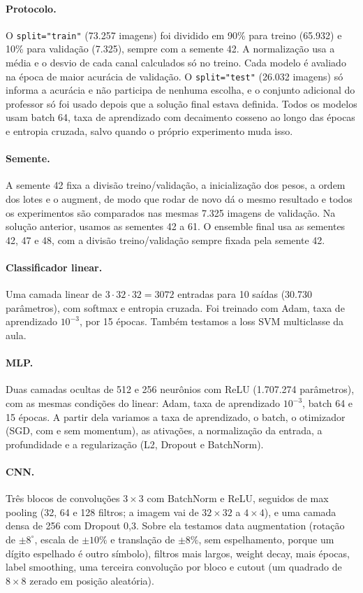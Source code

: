 \documentclass[11pt,a4paper]{article}
\begin{document}
\paragraph{Protocolo.} O \texttt{split="train"} (73.257 imagens) foi dividido em 90\% para treino (65.932) e
10\% para validação (7.325), sempre com a semente 42. A normalização usa a média e o desvio de cada canal
calculados só no treino. Cada modelo é avaliado na época de maior acurácia de validação. O \texttt{split="test"}
(26.032 imagens) só informa a acurácia e não participa de nenhuma escolha, e o conjunto adicional do professor
só foi usado depois que a solução final estava definida. Todos os modelos usam batch 64, taxa de aprendizado
com decaimento cosseno ao longo das épocas e entropia cruzada, salvo quando o próprio experimento muda isso.

\paragraph{Semente.} A semente 42 fixa a divisão treino/validação, a inicialização dos pesos, a ordem dos lotes
e o augment, de modo que rodar de novo dá o mesmo resultado e todos os experimentos são comparados nas mesmas
7.325 imagens de validação. Na solução anterior, usamos as sementes 42 a 61. O ensemble final usa as sementes 42, 47 e 48,
com a divisão treino/validação sempre fixada pela semente 42.

\paragraph{Classificador linear.} Uma camada linear de $3\cdot32\cdot32 = 3072$ entradas para 10 saídas
(30.730 parâmetros), com softmax e entropia cruzada. Foi treinado com Adam, taxa de aprendizado $10^{-3}$, por 15
épocas. Também testamos a loss SVM multiclasse da aula.

\paragraph{MLP.} Duas camadas ocultas de 512 e 256 neurônios com ReLU (1.707.274 parâmetros), com as mesmas
condições do linear: Adam, taxa de aprendizado $10^{-3}$, batch 64 e 15 épocas. A partir dela variamos a taxa de
aprendizado, o batch, o otimizador (SGD, com e sem momentum), as ativações, a normalização da entrada, a
profundidade e a regularização (L2, Dropout e BatchNorm).

\paragraph{CNN.} Três blocos de convoluções $3\times3$ com BatchNorm e ReLU, seguidos de max pooling (32, 64 e
128 filtros; a imagem vai de $32\times32$ a $4\times4$), e uma camada densa de 256 com Dropout 0,3. Sobre ela
testamos data augmentation (rotação de $\pm8^\circ$, escala de $\pm10\%$ e translação de $\pm8\%$, sem
espelhamento, porque um dígito espelhado é outro símbolo), filtros mais largos, weight decay, mais épocas, label
smoothing, uma terceira convolução por bloco e cutout (um quadrado de $8\times8$ zerado em posição aleatória).
\end{document}
